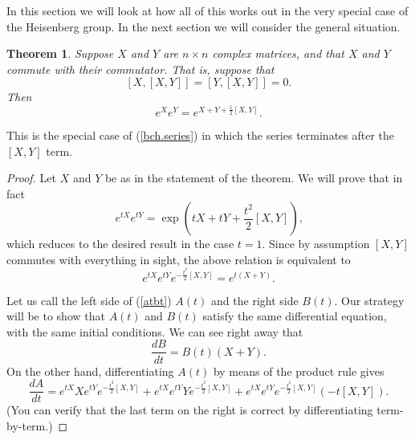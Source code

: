 \documentclass[12pt]{amsbook}
\theoremstyle{plain}
\newtheorem{theorem}{Theorem}
\numberwithin{equation}{chapter}
\numberwithin{theorem}{chapter}
\begin{document}
In this section we will look at how all of this works out in the very special
case of the Heisenberg group. In the next section we will consider the general situation.

\begin{theorem}
\label{bch.heisenberg}Suppose $X$ and $Y$ are $n\times n$ complex matrices,
and that $X$ and $Y$ commute with their commutator. That is, suppose that
\[
\left[  X,\left[  X,Y\right]  \right]  =\left[  Y,\left[  X,Y\right]  \right]
=0\text{.}%
\]
Then
\[
e^{X}e^{Y}=e^{X+Y+\frac{1}{2}\left[  X,Y\right]  }\text{.}%
\]
\end{theorem}

This is the special case of (\ref{bch.series}) in which the series terminates
after the $\left[  X,Y\right]  $ term.

\begin{proof}
Let $X$ and $Y$ be as in the statement of the theorem. We will prove that in
fact
\[
e^{tX}e^{tY}=\exp\left(  tX+tY+\frac{t^{2}}{2}\left[  X,Y\right]  \right)
\text{,}%
\]
which reduces to the desired result in the case $t=1$. Since by assumption
$\left[  X,Y\right]  $ commutes with everything in sight, the above relation
is equivalent to
\begin{equation}
e^{tX}e^{tY}e^{-\frac{t^{2}}{2}\left[  X,Y\right]  }=e^{t\left(  X+Y\right)
}\text{.}\label{atbt}%
\end{equation}

Let us call the left side of (\ref{atbt}) $A(t)$ and the right side $B\left(
t\right)  $. Our strategy will be to show that $A\left(  t\right)  $ and
$B\left(  t\right)  $ satisfy the same differential equation, with the same
initial conditions. We can see right away that
\[
\frac{dB}{dt}=B\left(  t\right)  \left(  X+Y\right)  \text{.}%
\]
On the other hand, differentiating $A\left(  t\right)  $ by means of the
product rule gives
\begin{equation}
\frac{dA}{dt}=e^{tX}Xe^{tY}e^{-\frac{t^{2}}{2}\left[  X,Y\right]  }%
+e^{tX}e^{tY}Ye^{-\frac{t^{2}}{2}\left[  X,Y\right]  }+e^{tX}e^{tY}%
e^{-\frac{t^{2}}{2}\left[  X,Y\right]  }\left(  -t\left[  X,Y\right]  \right)
\text{.}\label{part.deriv}%
\end{equation}
(You can verify that the last term on the right is correct by differentiating term-by-term.)


\end{proof}
\end{document}

